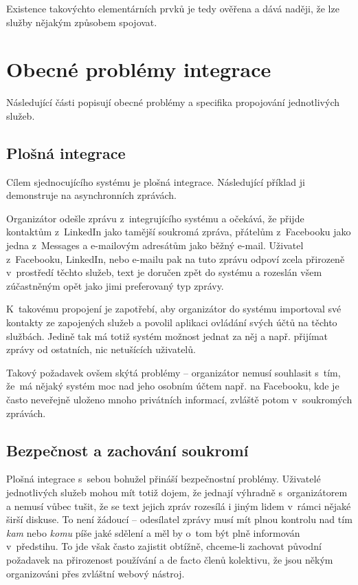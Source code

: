 \documentclass[12pt,oneside,final]{fithesis2}
\begin{document}
Existence takovýchto elementárních prvků je tedy ověřena a dává naději, že lze služby nějakým způsobem spojovat.


\section{Obecné problémy integrace}
Následující části popisují obecné problémy a specifika propojování jednotlivých služeb.

\subsection{Plošná integrace}
Cílem sjednocujícího systému je plošná integrace. Následující příklad ji demonstruje na asynchronních zprávách.

Organizátor odešle zprávu z~integrujícího systému a očekává, že přijde kontaktům z~LinkedIn jako tamější soukromá zpráva, přátelům z~Facebooku jako jedna z~Messages a e-mailovým adresátům jako běžný e-mail. Uživatel z~Facebooku, LinkedIn, nebo e-mailu pak na tuto zprávu odpoví zcela přirozeně v~prostředí těchto služeb, text je doručen zpět do systému a rozeslán všem zúčastněným opět jako jimi preferovaný typ zprávy.

K~takovému propojení je zapotřebí, aby organizátor do systému importoval své kontakty ze zapojených služeb a povolil aplikaci ovládání svých účtů na těchto službách. Jedině tak má totiž systém možnost jednat za něj a např. přijímat zprávy od ostatních, nic netušících uživatelů.

Takový požadavek ovšem skýtá problémy -- or\-ga\-ni\-zá\-tor ne\-mu\-sí sou\-hla\-sit s~tím, že~má nějaký systém moc nad jeho osobním účtem např. na Facebooku, kde je často neveřejně uloženo mnoho privátních informací, zvláště potom v~soukromých zprávách.

\subsection{Bezpečnost a zachování soukromí}\label{security}
Plošná integrace s~sebou bohužel přináší bezpečnostní problémy. Uživatelé jednotlivých služeb mohou mít totiž dojem, že jednají výhradně s~organizátorem a nemusí vůbec tušit, že se text jejich zpráv rozesílá i jiným lidem v~rámci nějaké širší diskuse. To není žádoucí -- odesílatel zprávy musí mít plnou kontrolu nad tím \emph{kam} nebo \emph{komu} píše jaké sdělení a měl by o~tom být plně informován v~předstihu. To jde však často zajistit obtížně, chceme-li zachovat původní požadavek na přirozenost používání a de facto  členů kolektivu, že jsou někým organizováni přes zvláštní webový nástroj.
\end{document}

